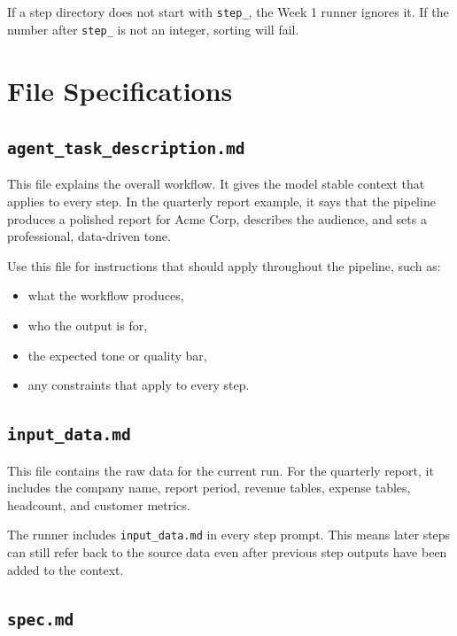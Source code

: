 \documentclass[12pt, a4paper]{article}
\begin{document}
\begin{warnbox}
If a step directory does not start with \texttt{step\_}, the Week 1 runner ignores it. If the number after \texttt{step\_} is not an integer, sorting will fail.
\end{warnbox}

\section{File Specifications}

\subsection{\texttt{agent\_task\_description.md}}

This file explains the overall workflow. It gives the model stable context that applies to every step. In the quarterly report example, it says that the pipeline produces a polished report for Acme Corp, describes the audience, and sets a professional, data-driven tone.

Use this file for instructions that should apply throughout the pipeline, such as:

\begin{itemize}[leftmargin=1.5em]
  \item what the workflow produces,
  \item who the output is for,
  \item the expected tone or quality bar,
  \item any constraints that apply to every step.
\end{itemize}

\subsection{\texttt{input\_data.md}}

This file contains the raw data for the current run. For the quarterly report, it includes the company name, report period, revenue tables, expense tables, headcount, and customer metrics.

The runner includes \texttt{input\_data.md} in every step prompt. This means later steps can still refer back to the source data even after previous step outputs have been added to the context.

\subsection{\texttt{spec.md}}
\end{document}
